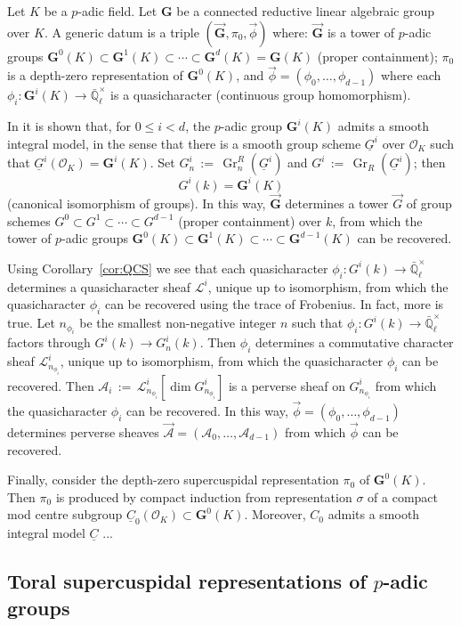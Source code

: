 \documentclass[10pt]{amsart}
\theoremstyle{plain}
\theoremstyle{definition}
\newcommand{\EE}{\mathbb{\bar Q}_\ell}
\newcommand{\OK}{\mathcal{O}_K}
\newcommand{\Fq}{k}
\newcommand{\EEx}{\EE^\times}
\newcommand{\G}{\textbf{G}}
\DeclareMathOperator{\Gr}{Gr}
\newcommand{\ceq}{{\, :=\, }}
\newcommand{\cs}[1]{{\mathcal{#1}}}
\begin{document}
Let $K$ be a $p$-adic field. Let $\G$ be a connected reductive linear algebraic group over $K$. 
A generic datum is a triple $(\vec{\G}, \pi_0, \vec{\phi})$ where: $\vec{\G}$ is a tower of $p$-adic groups $\G^0(K) \subset \G^1(K) \subset \cdots  \subset \G^d(K) = \G(K)$ (proper containment); $\pi_0$ is a depth-zero representation of $\G^0(K)$, and $\vec{\phi} = (\phi_0, \ldots , \phi_{d-1})$ where each $\phi_i : \G^i(K) \to \EEx$ is a quasicharacter (continuous group homomorphism).  


In \cite{yu:03a} it is shown that, for $0 \leq i < d$, the $p$-adic group $\G^i(K)$ admits a smooth integral model, in the sense that there is a smooth group scheme $\underline{G}^i$ over $\OK$ such that $\underline{G}^i(\OK) = \G^i(K)$.
Set $G^i_n \ceq \Gr^R_n(\underline{G}^i)$ and $G^i \ceq \Gr_R(\underline{G}^i)$; 
then \[G^i(\Fq) = \G^i(K)\] (canonical isomorphism of groups).
In this way, $\vec{\G}$ determines a tower $\vec{G}$ of group schemes $G^0 \subset G^1 \subset \cdots  \subset G^{d-1}$ (proper containment) over $\Fq$, from which the tower of $p$-adic groups
$\G^0(K) \subset \G^1(K) \subset \cdots  \subset \G^{d-1}(K)$ can be recovered.

Using Corollary~\ref{cor:QCS} we see that each quasicharacter $\phi_i : G^i(\Fq) \to \EEx$ determines a quasicharacter sheaf $\cs{L}^i$, unique up to isomorphism, from which the quasicharacter $\phi_i$ can be recovered using the trace of Frobenius. 
In fact, more is true. Let $n_{\phi_i}$ be the smallest non-negative integer $n$ such that $\phi_i : G^i(\Fq) \to \EEx$ factors through $G^i(\Fq) \to G^i_n(\Fq)$.
Then $\phi_i$ determines a commutative character sheaf $\cs{L}_{n_{\phi_i}}^i$, unique up to isomorphism, from which the quasicharacter $\phi_i$ can be recovered.
Then $\cs{A}_i\ceq \cs{L}_{n_{\phi_i}}^i[\dim G_{n_{\phi_i}}^i]$ is a perverse sheaf on $G_{n_{\phi_i}}^i$ from which the quasicharacter $\phi_i$ can be recovered.
In this way,  $\vec{\phi} = (\phi_0, \ldots , \phi_{d-1})$ determines perverse sheaves $\vec{\cs{A}} = (\cs{A}_0, \ldots , \cs{A}_{d-1})$ from which $\vec{\phi}$ can be recovered. 

Finally, consider the depth-zero supercuspidal representation $\pi_0$ of $\G^0(K)$.
Then $\pi_0$ is produced by compact induction from representation $\sigma$ of a compact mod centre subgroup $\underline{C}_0(\OK) \subset \G^0(K)$. Moreover, $C_0$ admits a smooth integral model $\underline{C}$ ...

\subsection{Toral supercuspidal representations of $p$-adic groups}




\end{document}
